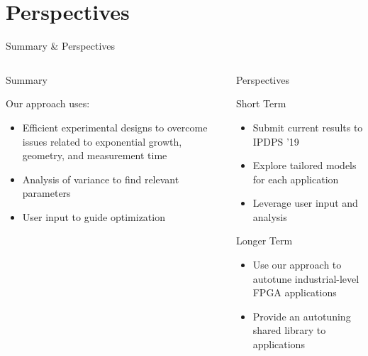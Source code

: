 \documentclass[10pt, compress, aspectratio=169, xcolor={table,usenames,dvipsnames}]{beamer}
\begin{document}
\section{Perspectives}
\label{sec:orge4712ab}
\begin{frame}[label={sec:orgce6b298}]{Summary \& Perspectives}
\begin{columns}
\begin{column}{0.5\columnwidth}
\begin{block}{Summary}
\vspace{.2cm}

Our approach uses:

\begin{itemize}
\item \alert{Efficient experimental designs} to overcome issues related to \alert{exponential growth}, \alert{geometry}, and \alert{measurement time}
\item \alert{Analysis of variance} to find \alert{relevant parameters}
\item \alert{User input} to guide optimization
\end{itemize}

\vspace{2cm}
\end{block}
\end{column}
\begin{column}{0.5\columnwidth}
\begin{block}{Perspectives}
\begin{block}{\alert{Short Term}}
\begin{itemize}
\item Submit current results to \alert{IPDPS '19}
\item Explore \alert{tailored models} for each application
\item Leverage \alert{user input} and \alert{analysis}
\end{itemize}
\end{block}

\begin{block}{\alert{Longer Term}}
\begin{itemize}
\item Use our approach to \alert{autotune industrial-level FPGA applications}
\item Provide an \alert{autotuning shared library} to applications
\end{itemize}
\end{block}
\end{block}
\end{column}
\end{columns}
\end{frame}
\end{document}

